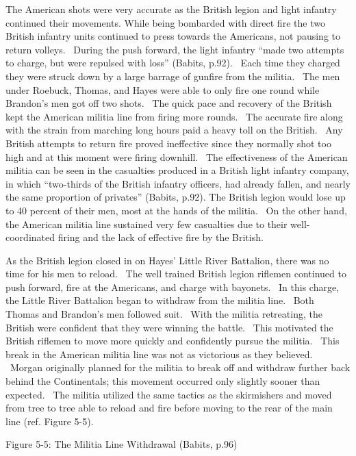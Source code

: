 The American shots were very accurate as the British legion and light infantry
continued their movements.  While being bombarded with direct fire the two
British infantry units continued to press towards the Americans, not pausing to
return volleys.  During the push forward, the light infantry “made two attempts
to charge, but were repulsed with loss” (Babits, p.92).  Each time they charged
they were struck down by a large barrage of gunfire from the militia.  The men
under Roebuck, Thomas, and Hayes were able to only fire one round while
Brandon’s men got off two shots.  The quick pace and recovery of the British
kept the American militia line from firing more rounds.  The accurate fire along
with the strain from marching long hours paid a heavy toll on the British.  Any
British attempts to return fire proved ineffective since they normally shot too
high and at this moment were firing downhill.  The effectiveness of the American
militia can be seen in the casualties produced in a British light infantry
company, in which “two-thirds of the British infantry officers, had already
fallen, and nearly the same proportion of privates” (Babits, p.92).  The British
legion would lose up to 40 percent of their men, most at the hands of the
militia.  On the other hand, the American militia line sustained very few
casualties due to their well-coordinated firing and the lack of effective fire
by the British.

As the British legion closed in on Hayes’ Little River Battalion, there was no
time for his men to reload.  The well trained British legion riflemen continued
to push forward, fire at the Americans, and charge with bayonets.  In this
charge, the Little River Battalion began to withdraw from the militia line.
 Both Thomas and Brandon’s men followed suit.  With the militia retreating, the
British were confident that they were winning the battle.  This motivated the
British riflemen to move more quickly and confidently pursue the militia.  This
break in the American militia line was not as victorious as they believed.
 Morgan originally planned for the militia to break off and withdraw further
back behind the Continentals; this movement occurred only slightly sooner than
expected.  The militia utilized the same tactics as the skirmishers and moved
from tree to tree able to reload and fire before moving to the rear of the main
line (ref. Figure 5-5).



                         

				  Figure 5-5: The Militia Line Withdrawal
(Babits, p.96)





